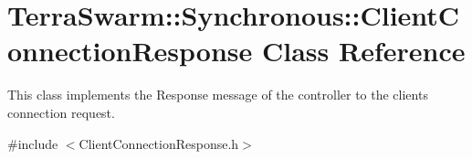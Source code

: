 \hypertarget{class_terra_swarm_1_1_synchronous_1_1_client_connection_response}{\section{Terra\-Swarm\-:\-:Synchronous\-:\-:Client\-Connection\-Response Class Reference}
\label{class_terra_swarm_1_1_synchronous_1_1_client_connection_response}
}


This class implements the Response message of the controller to the clients connection request.  




{\ttfamily \#include $<$Client\-Connection\-Response.\-h$>$}


